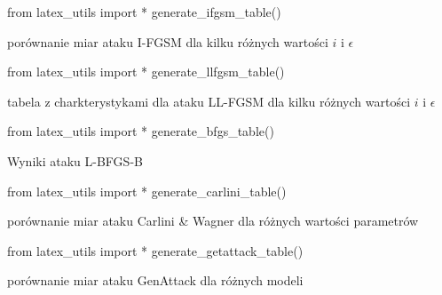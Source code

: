 \documentclass[
    left=2.5cm,         %
    right=2.5cm,        %
    top=2.5cm,          %
    bottom=3cm,         %
    bindingoffset=6mm,  %
    nohyphenation=false %
]{eiti/eiti-thesis}
\begin{document}
\begin{table}[H]
\begin{adjustbox}{max width=\textwidth}
\begin{pycode}
from latex_utils import *
generate_ifgsm_table()
\end{pycode}
\end{adjustbox}
\caption{porównanie miar ataku I-FGSM dla kilku różnych wartości \(i\) i \(\epsilon\)}
\end{table}

\begin{table}[H]
\begin{adjustbox}{max width=\textwidth}
\begin{pycode}
from latex_utils import *
generate_llfgsm_table()
\end{pycode}
\end{adjustbox}
\caption{tabela z charkterystykami dla ataku LL-FGSM dla kilku różnych wartości \(i\) i \(\epsilon\)}
\end{table}

\begin{table}[H]
\begin{adjustbox}{max width=\textwidth}
\begin{pycode}
from latex_utils import *
generate_bfgs_table()
\end{pycode}

\end{adjustbox}
\caption{Wyniki ataku L-BFGS-B}
\end{table}

\begin{table}[H]
\begin{adjustbox}{max width=\textwidth}
\begin{pycode}
from latex_utils import *
generate_carlini_table()
\end{pycode}
\end{adjustbox}
\caption{porównanie miar ataku Carlini & Wagner dla różnych wartości parametrów}
\end{table}

\begin{table}[H]
\begin{adjustbox}{max width=\textwidth}
\begin{pycode}
from latex_utils import *
generate_getattack_table()
\end{pycode}
\end{adjustbox}
\caption{porównanie miar ataku GenAttack dla różnych modeli}
\end{table}
\end{document}
